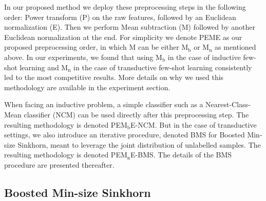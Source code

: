 \documentclass[review]{elsarticle}
\begin{document}
In our proposed method we deploy these preprocessing steps in the following order: Power transform (P) on the raw features, followed by an Euclidean normalization (E). Then we perform Mean subtraction (M) followed by another Euclidean normalization at the end. For simplicity we denote PEME as our proposed preprocessing order, in which M can be either $\mathrm{M_b}$ or $\mathrm{M_n}$ as mentioned above. In our experiments, we found that using $\mathrm{M_b}$ in the case of inductive few-shot learning and $\mathrm{M_n}$ in the case of transductive few-shot learning consistently led to the most competitive results. More details on why we used this methodology are available in the experiment section.



When facing an inductive problem, a simple classifier such as a Nearest-Class-Mean classifier (NCM) can be used directly after this preprocessing step. The resulting methodology is denoted PE$\mathrm{M_b}$E-NCM. But in the case of transductive settings, we also introduce an iterative procedure, denoted BMS for Boosted Min-size Sinkhorn, meant to leverage the joint distribution of unlabelled samples. The resulting methodology is denoted PE$\mathrm{M_n}$E-BMS. The details of the BMS procedure are presented thereafter.



\subsection{Boosted Min-size Sinkhorn}
\end{document}
